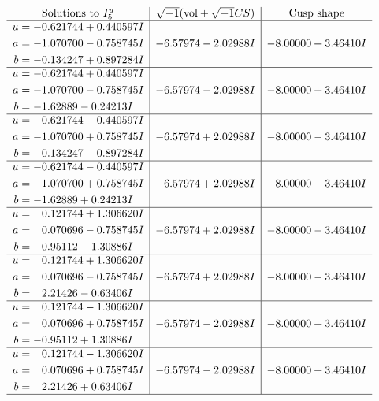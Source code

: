 \documentclass[1p]{elsarticle_modified}
\theoremstyle{definition}
\newcommand{\I}{\sqrt{-1}}
\begin{document}
$$\begin{array}{c|c|c}  
\text{Solutions to }I^u_{5}& \I (\text{vol} + \sqrt{-1}CS) & \text{Cusp shape}\\
 \hline 
\begin{aligned}
u &= -0.621744 + 0.440597 I \\
a &= -1.070700 - 0.758745 I \\
b &= -0.134247 + 0.897284 I\end{aligned}
 & -6.57974 - 2.02988 I & -8.00000 + 3.46410 I \\ \hline\begin{aligned}
u &= -0.621744 + 0.440597 I \\
a &= -1.070700 - 0.758745 I \\
b &= -1.62889 - 0.24213 I\end{aligned}
 & -6.57974 - 2.02988 I & -8.00000 + 3.46410 I \\ \hline\begin{aligned}
u &= -0.621744 - 0.440597 I \\
a &= -1.070700 + 0.758745 I \\
b &= -0.134247 - 0.897284 I\end{aligned}
 & -6.57974 + 2.02988 I & -8.00000 - 3.46410 I \\ \hline\begin{aligned}
u &= -0.621744 - 0.440597 I \\
a &= -1.070700 + 0.758745 I \\
b &= -1.62889 + 0.24213 I\end{aligned}
 & -6.57974 + 2.02988 I & -8.00000 - 3.46410 I \\ \hline\begin{aligned}
u &= \phantom{-}0.121744 + 1.306620 I \\
a &= \phantom{-}0.070696 - 0.758745 I \\
b &= -0.95112 - 1.30886 I\end{aligned}
 & -6.57974 + 2.02988 I & -8.00000 - 3.46410 I \\ \hline\begin{aligned}
u &= \phantom{-}0.121744 + 1.306620 I \\
a &= \phantom{-}0.070696 - 0.758745 I \\
b &= \phantom{-}2.21426 - 0.63406 I\end{aligned}
 & -6.57974 + 2.02988 I & -8.00000 - 3.46410 I \\ \hline\begin{aligned}
u &= \phantom{-}0.121744 - 1.306620 I \\
a &= \phantom{-}0.070696 + 0.758745 I \\
b &= -0.95112 + 1.30886 I\end{aligned}
 & -6.57974 - 2.02988 I & -8.00000 + 3.46410 I \\ \hline\begin{aligned}
u &= \phantom{-}0.121744 - 1.306620 I \\
a &= \phantom{-}0.070696 + 0.758745 I \\
b &= \phantom{-}2.21426 + 0.63406 I\end{aligned}
 & -6.57974 - 2.02988 I & -8.00000 + 3.46410 I\\
 \hline 
 \end{array}$$\newpage\newpage\renewcommand{\arraystretch}{1}
\end{document}

